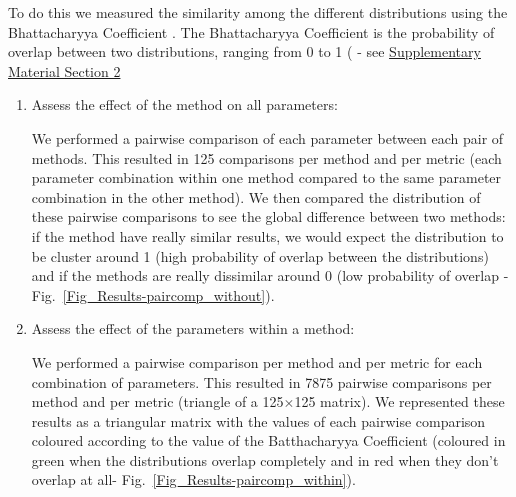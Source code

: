 \documentclass[12pt,letterpaper]{article}
\begin{document}

To do this we measured the similarity among the different distributions %
using the Bhattacharyya Coefficient \citep{Bhattacharyya}. The Bhattacharyya Coefficient is the probability of overlap between two distributions, ranging from 0 to 1 (\citealt{Bhattacharyya} - see \hyperref[SupplementaryMaterial]{Supplementary Material Section 2} %

\begin{enumerate}
\item{Assess the effect of the method on all parameters:}

We performed a pairwise comparison of each parameter between each pair of methods. This resulted in 125 comparisons per method and per metric (each parameter combination within one method compared to the same parameter combination in the other method). We then compared the distribution of these pairwise comparisons to see the global difference between two methods: if the method have really similar results, we would expect the distribution to be cluster around 1 (high probability of overlap between the distributions) and if the methods are really dissimilar around 0 (low probability of overlap - Fig.~\ref{Fig_Results-paircomp_without}).
\item{Assess the effect of the parameters within a method:}

We performed a pairwise comparison per method and per metric for each combination of parameters. This resulted in 7875 pairwise comparisons per method and per metric (triangle of a 125$\times$125 matrix). We represented these results as a triangular matrix with the values of each pairwise comparison coloured according to the value of the Batthacharyya Coefficient (coloured in green when the distributions overlap completely and in red when they don't overlap at all- Fig.~\ref{Fig_Results-paircomp_within}).
\end{enumerate}

%
%
\end{document}

